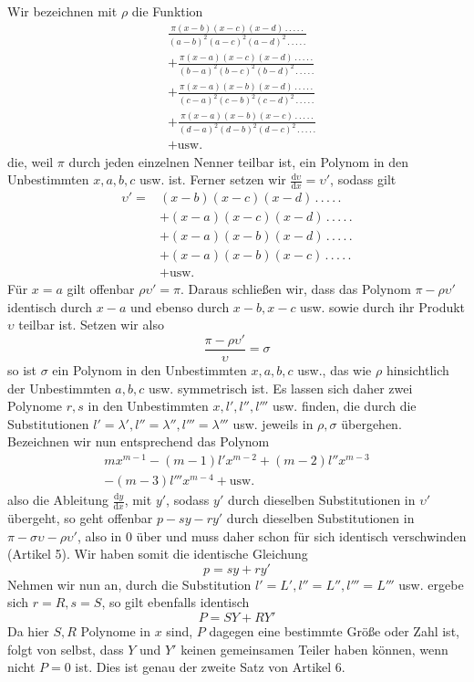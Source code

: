 Wir bezeichnen mit $\rho$ die Funktion
\[
\begin{aligned}
&\frac{\pi(x-b)(x-c)(x-d)\, .\, .\, .\, .\, .}{(a-b)^2(a-c)^2(a-d)^2\, .\, .\, .\, .\, .}\\
&+\frac{\pi(x-a)(x-c)(x-d)\, .\, .\, .\, .\, .}{(b-a)^2(b-c)^2(b-d)^2\, .\, .\, .\, .\, .}\\
&+\frac{\pi(x-a)(x-b)(x-d)\, .\, .\, .\, .\, .}{(c-a)^2(c-b)^2(c-d)^2\, .\, .\, .\, .\, .}\\
&+\frac{\pi(x-a)(x-b)(x-c)\, .\, .\, .\, .\, .}{(d-a)^2(d-b)^2(d-c)^2\, .\, .\, .\, .\, .}\\
&+\text{usw.}
\end{aligned}
\]
die, weil $\pi$ durch jeden einzelnen Nenner teilbar ist, ein Polynom in den Unbestimmten $x,a,b,c$ usw. ist. Ferner setzen wir $\frac{\mathrm d\upsilon}{\mathrm dx}=\upsilon'$, sodass gilt
\[
\begin{aligned}
\upsilon'={}&(x-b)(x-c)(x-d)\, .\, .\, .\, .\, .\\
&+(x-a)(x-c)(x-d)\, .\, .\, .\, .\, .\\
&+(x-a)(x-b)(x-d)\, .\, .\, .\, .\, .\\
&+(x-a)(x-b)(x-c)\, .\, .\, .\, .\, .\\
&+\text{usw.}
\end{aligned}
\]
Für $x=a$ gilt offenbar $\rho\upsilon'=\pi$. Daraus schließen wir, dass das Polynom $\pi-\rho\upsilon'$ identisch durch $x-a$ und ebenso durch $x-b,x-c$ usw. sowie durch ihr Produkt $\upsilon$ teilbar ist. Setzen wir also
\[
\frac{\pi-\rho\upsilon'}{\upsilon}=\sigma
\]
so ist $\sigma$ ein Polynom in den Unbestimmten $x,a,b,c$ usw., das wie $\rho$ hinsichtlich der Unbestimmten $a,b,c$ usw. symmetrisch ist. Es lassen sich daher zwei Polynome $r,s$ in den Unbestimmten $x,l',l'',l'''$ usw. finden, die durch die Substitutionen $l'=\lambda',l''=\lambda'',l'''=\lambda'''$ usw. jeweils in $\rho,\sigma$ übergehen. Bezeichnen wir nun entsprechend das Polynom
\[
\begin{gathered}mx^{m-1}-(m-1)l'x^{m-2}+(m-2)l''x^{m-3}\\-(m-3)l'''x^{m-4}+\text{usw.}\end{gathered}
\]
also die Ableitung $\frac{\mathrm dy}{\mathrm dx}$, mit $y'$, sodass $y'$ durch dieselben
Substitutionen in $\upsilon'$ übergeht, so geht offenbar $p-sy-ry'$ durch dieselben Substitutionen in $\pi-\sigma\upsilon-\rho\upsilon'$, also in 0 über und muss daher schon für sich identisch verschwinden (Artikel 5). Wir haben somit die identische Gleichung
\[
p=sy+ry'
\]
Nehmen wir nun an, durch die Substitution $l'=L',l''=L'',l'''=L'''$ usw. ergebe sich $r=R,s=S$, so gilt ebenfalls identisch
\[
P=SY+RY'
\]
Da hier $S,R$ Polynome in $x$ sind, $P$ dagegen eine bestimmte Größe oder Zahl ist, folgt von selbst, dass $Y$ und $Y'$ keinen gemeinsamen Teiler haben können, wenn nicht $P=0$ ist. Dies ist genau der zweite Satz von Artikel 6.

